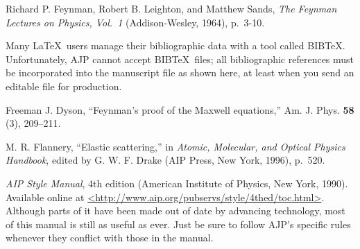 \documentclass[prb,preprint]{revtex4-1}
\begin{document}
\begin{thebibliography}{99}
 Richard P. Feynman, Robert B. Leighton, and Matthew Sands, 
\textit{The Feynman Lectures on Physics, Vol.\ 1} (Addison-Wesley, 1964), p.~3-10.

 Many \LaTeX\ users manage their bibliographic data with 
a tool called BIB\TeX.  Unfortunately, AJP cannot accept BIB\TeX\ files; all 
bibliographic references must be incorporated into the manuscript file
as shown here, at least when you send an editable file for production.

 Freeman J. Dyson, ``Feynman's proof of the Maxwell equations,''
Am. J. Phys. \textbf{58} (3), 209--211.  

 M. R. Flannery, ``Elastic scattering,'' in 
\textit{Atomic, Molecular, and Optical Physics Handbook}, edited by
G. W. F. Drake (AIP Press, New York, 1996), p.~520.

 \textit{AIP Style Manual}, 4th edition (American 
Institute of Physics, New York, 1990). Available online at 
\url{<http://www.aip.org/pubservs/style/4thed/toc.html>}. Although parts of 
it have been made out of date by advancing technology, most of this manual 
is still as useful as ever. Just be sure to follow AJP's specific rules
whenever they conflict with those in the manual.

\end{thebibliography}


\end{document}
